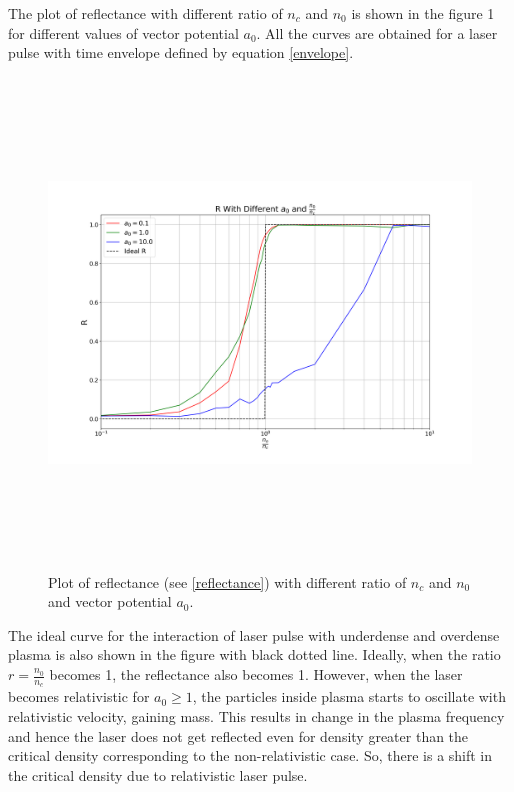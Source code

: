\documentclass[]{article}
\begin{document}
The plot of reflectance with different ratio of $n_c$ and $n_0$ is shown in the figure 1 for different values of vector potential $a_0$. All the curves are obtained for a laser pulse with time envelope defined by equation \ref{envelope}.
\begin{figure}
    \label{reflectance_fig}
    \includegraphics[width=18cm, height=13cm]{reflection.png}
    \centering
    \caption{Plot of reflectance (see \ref{reflectance}) with different ratio of $n_c$ and $n_0$ and vector potential $a_0$.}

\end{figure}
The ideal curve for the interaction of laser pulse with underdense and overdense plasma is also shown in the figure with black dotted line. Ideally, when the ratio $r = \frac{n_0}{n_c}$ becomes 1, the reflectance also becomes 1. However, when the laser becomes relativistic for $a_0 \ge 1$, the particles inside plasma starts to oscillate with relativistic velocity, gaining mass. This results in change in the plasma frequency and hence the laser does not get reflected even for density greater than the critical density corresponding to the non-relativistic case. So, there is a shift in the critical density due to relativistic laser pulse.
\end{document}
